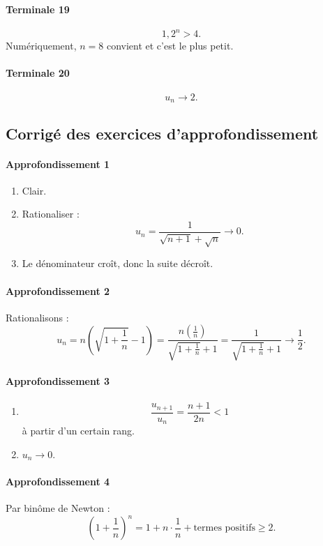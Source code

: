 \documentclass[11pt,a4paper]{article}
\theoremstyle{definition}
\begin{document}
\paragraph{Terminale 19}
\[
1{,}2^n>4.
\]
Numériquement, $n=8$ convient et c'est le plus petit.

\paragraph{Terminale 20}
\[
u_n\to 2.
\]

\subsection{Corrigé des exercices d'approfondissement}

\paragraph{Approfondissement 1}
\begin{enumerate}[label=\arabic*.]
    \item Clair.
    \item Rationaliser :
    \[
    u_n=\frac{1}{\sqrt{n+1}+\sqrt n}\to0.
    \]
    \item Le dénominateur croît, donc la suite décroît.
\end{enumerate}

\paragraph{Approfondissement 2}
Rationalisons :
\[
u_n=n\left(\sqrt{1+\frac1n}-1\right)
=\frac{n\left(\frac1n\right)}{\sqrt{1+\frac1n}+1}
=\frac{1}{\sqrt{1+\frac1n}+1}\to \frac12.
\]

\paragraph{Approfondissement 3}
\begin{enumerate}[label=\arabic*.]
    \item
    \[
    \frac{u_{n+1}}{u_n}=\frac{n+1}{2n}<1
    \]
    à partir d'un certain rang.
    \item $u_n\to0$.
\end{enumerate}

\paragraph{Approfondissement 4}
Par binôme de Newton :
\[
\left(1+\frac1n\right)^n=1+n\cdot \frac1n+\text{termes positifs}\ge2.
\]
\end{document}
